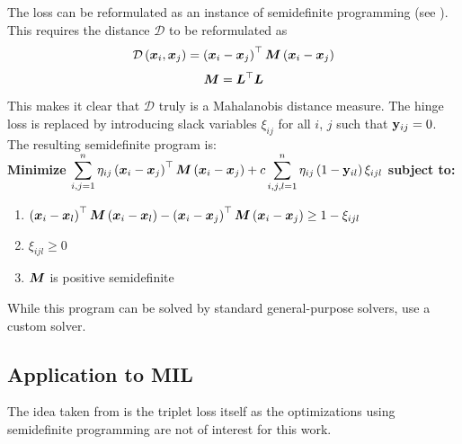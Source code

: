 The loss can be reformulated as an instance of semidefinite programming (see \cite{vandenberghe_semidefinite_1996}). This requires the distance \( \mathcal{D} \) to be reformulated as
\[ \mathcal{D} \left( \bm{x}_i, \bm{x}_j \right) = \left( \bm{x}_i - \bm{x}_j \right)^\top \bm{M} \left( \bm{x}_i - \bm{x}_j \right) \]
\[ \bm{M} = \bm{L}^\top \bm{L} \]
This makes it clear that \( \mathcal{D} \) truly is a Mahalanobis distance measure. The hinge loss is replaced by introducing slack variables \( \xi_{ij} \) for all \( i \), \( j \) such that \( \mathbf{y}_{ij} = 0 \). The resulting semidefinite program is: \\

\noindent \textbf{Minimize} \( \displaystyle \sum_{i, j = 1}^n \mathbf{\eta}_{ij} \left( \bm{x}_i - \bm{x}_j \right)^\top \bm{M} \left( \bm{x}_i - \bm{x}_j \right) + c \sum_{i, j, l = 1}^n \mathbf{\eta}_{ij} \left( 1 - \mathbf{y}_{il} \right) \xi_{ijl} \) \textbf{subject to:}
\begin{enumerate}[\textbf{(\theenumi)}]
  \item \( \displaystyle \left( \bm{x}_i - \bm{x}_l \right)^\top \bm{M} \left( \bm{x}_i - \bm{x}_l \right) - \left( \bm{x}_i - \bm{x}_j \right)^\top \bm{M} \left( \bm{x}_i - \bm{x}_j \right) \geq 1 - \xi_{ijl} \)
  \item \( \displaystyle \xi_{ijl} \geq 0 \)
  \item \( \displaystyle \bm{M} \) is positive semidefinite
\end{enumerate}

While this program can be solved by standard general-purpose solvers, \cite{weinberger_distance_2006} use a custom solver.

\subsection{Application to MIL}
The idea taken from \cite{weinberger_distance_2006} is the triplet loss itself as the optimizations using semidefinite programming are not of interest for this work.

